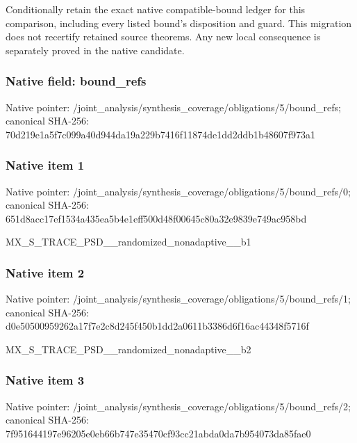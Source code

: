 \documentclass[10pt,a4paper]{article}
\begin{document}
\begingroup\raggedright\sloppy Conditionally retain the exact native compatible-bound ledger for this comparison,\allowbreak{} including every listed bound's disposition and guard. This migration does not recertify retained source theorems. Any new local consequence is separately proved in the native candidate.\par\endgroup

\subsubsection{Native field: bound\_\allowbreak{}refs}
Native pointer: /joint\_\allowbreak{}analysis/synthesis\_\allowbreak{}coverage/obligations/5/bound\_\allowbreak{}refs; canonical SHA-256: 70d219e1a5f7c099a40d944da19a229b7416f11874de1dd2ddb1b48607f973a1

\subsubsection{Native item 1}
Native pointer: /joint\_\allowbreak{}analysis/synthesis\_\allowbreak{}coverage/obligations/5/bound\_\allowbreak{}refs/0; canonical SHA-256: 651d8acc17ef1534a435ea5b4e1eff500d48f00645c80a32e9839e749ac958bd

\begingroup\raggedright\sloppy MX\_\allowbreak{}S\_\allowbreak{}TRACE\_\allowbreak{}PSD\_\allowbreak{}\_\allowbreak{}randomized\_\allowbreak{}nonadaptive\_\allowbreak{}\_\allowbreak{}b1\par\endgroup

\subsubsection{Native item 2}
Native pointer: /joint\_\allowbreak{}analysis/synthesis\_\allowbreak{}coverage/obligations/5/bound\_\allowbreak{}refs/1; canonical SHA-256: d0e50500959262a17f7e2c8d245f450b1dd2a0611b3386d6f16ac44348f5716f

\begingroup\raggedright\sloppy MX\_\allowbreak{}S\_\allowbreak{}TRACE\_\allowbreak{}PSD\_\allowbreak{}\_\allowbreak{}randomized\_\allowbreak{}nonadaptive\_\allowbreak{}\_\allowbreak{}b2\par\endgroup

\subsubsection{Native item 3}
Native pointer: /joint\_\allowbreak{}analysis/synthesis\_\allowbreak{}coverage/obligations/5/bound\_\allowbreak{}refs/2; canonical SHA-256: 7f951644197e96205e0eb66b747e35470cf93cc21abda0da7b954073da85fae0
\end{document}
